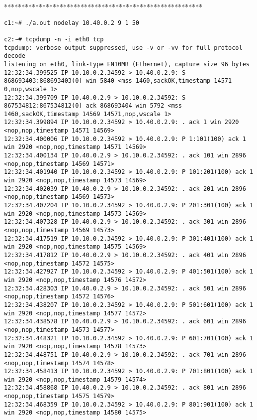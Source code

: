 \documentclass[a4paper,12pt]{article}
\begin{document}
*********************************************************

\begin{lstlisting}
c1:~# ./a.out nodelay 10.40.0.2 9 1 50

c2:~# tcpdump -n -i eth0 tcp
tcpdump: verbose output suppressed, use -v or -vv for full protocol decode
listening on eth0, link-type EN10MB (Ethernet), capture size 96 bytes
12:32:34.399525 IP 10.10.0.2.34592 > 10.40.0.2.9: S 868693403:868693403(0) win 5840 <mss 1460,sackOK,timestamp 14571 0,nop,wscale 1>
12:32:34.399709 IP 10.40.0.2.9 > 10.10.0.2.34592: S 867534812:867534812(0) ack 868693404 win 5792 <mss 1460,sackOK,timestamp 14569 14571,nop,wscale 1>
12:32:34.399894 IP 10.10.0.2.34592 > 10.40.0.2.9: . ack 1 win 2920 <nop,nop,timestamp 14571 14569>
12:32:34.400006 IP 10.10.0.2.34592 > 10.40.0.2.9: P 1:101(100) ack 1 win 2920 <nop,nop,timestamp 14571 14569>
12:32:34.400134 IP 10.40.0.2.9 > 10.10.0.2.34592: . ack 101 win 2896 <nop,nop,timestamp 14569 14571>
12:32:34.401940 IP 10.10.0.2.34592 > 10.40.0.2.9: P 101:201(100) ack 1 win 2920 <nop,nop,timestamp 14573 14569>
12:32:34.402039 IP 10.40.0.2.9 > 10.10.0.2.34592: . ack 201 win 2896 <nop,nop,timestamp 14569 14573>
12:32:34.407204 IP 10.10.0.2.34592 > 10.40.0.2.9: P 201:301(100) ack 1 win 2920 <nop,nop,timestamp 14573 14569>
12:32:34.407328 IP 10.40.0.2.9 > 10.10.0.2.34592: . ack 301 win 2896 <nop,nop,timestamp 14569 14573>
12:32:34.417519 IP 10.10.0.2.34592 > 10.40.0.2.9: P 301:401(100) ack 1 win 2920 <nop,nop,timestamp 14575 14569>
12:32:34.417812 IP 10.40.0.2.9 > 10.10.0.2.34592: . ack 401 win 2896 <nop,nop,timestamp 14572 14575>
12:32:34.427927 IP 10.10.0.2.34592 > 10.40.0.2.9: P 401:501(100) ack 1 win 2920 <nop,nop,timestamp 14576 14572>
12:32:34.428303 IP 10.40.0.2.9 > 10.10.0.2.34592: . ack 501 win 2896 <nop,nop,timestamp 14572 14576>
12:32:34.438207 IP 10.10.0.2.34592 > 10.40.0.2.9: P 501:601(100) ack 1 win 2920 <nop,nop,timestamp 14577 14572>
12:32:34.438578 IP 10.40.0.2.9 > 10.10.0.2.34592: . ack 601 win 2896 <nop,nop,timestamp 14573 14577>
12:32:34.448321 IP 10.10.0.2.34592 > 10.40.0.2.9: P 601:701(100) ack 1 win 2920 <nop,nop,timestamp 14578 14573>
12:32:34.448751 IP 10.40.0.2.9 > 10.10.0.2.34592: . ack 701 win 2896 <nop,nop,timestamp 14574 14578>
12:32:34.458413 IP 10.10.0.2.34592 > 10.40.0.2.9: P 701:801(100) ack 1 win 2920 <nop,nop,timestamp 14579 14574>
12:32:34.458868 IP 10.40.0.2.9 > 10.10.0.2.34592: . ack 801 win 2896 <nop,nop,timestamp 14575 14579>
12:32:34.468359 IP 10.10.0.2.34592 > 10.40.0.2.9: P 801:901(100) ack 1 win 2920 <nop,nop,timestamp 14580 14575>

\end{lstlisting}
\end{document}
